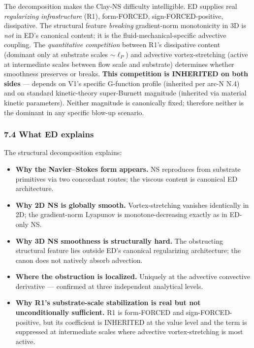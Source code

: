 \documentclass[
  11pt,a4paper]{article}
\providecommand{\tightlist}{%
  \setlength{\itemsep}{0pt}\setlength{\parskip}{0pt}}
\begin{document}
The decomposition makes the Clay-NS difficulty intelligible. ED supplies
real \emph{regularizing infrastructure} (R1), form-FORCED,
sign-FORCED-positive, dissipative. The structural feature
\emph{breaking} gradient-norm monotonicity in 3D is \emph{not} in ED's
canonical content; it is the fluid-mechanical-specific advective
coupling. The \emph{quantitative competition} between R1's dissipative
content (dominant only at substrate scales \(\sim \ell_P\)) and
advective vortex-stretching (active at intermediate scales between flow
scale and substrate) determines whether smoothness preserves or breaks.
\textbf{This competition is INHERITED on both sides} --- depends on V1's
specific G-function profile (inherited per arc-N N.4) and on standard
kinetic-theory super-Burnett magnitude (inherited via material kinetic
parameters). Neither magnitude is canonically fixed; therefore neither
is the dominant in any specific blow-up scenario.

\subsubsection{7.4 What ED explains}\label{what-ed-explains}

The structural decomposition explains:

\begin{itemize}
\tightlist
\item
  \textbf{Why the Navier--Stokes form appears.} NS reproduces from
  substrate primitives via two concordant routes; the viscous content is
  canonical ED architecture.
\item
  \textbf{Why 2D NS is globally smooth.} Vortex-stretching vanishes
  identically in 2D; the gradient-norm Lyapunov is monotone-decreasing
  exactly as in ED-only NS.
\item
  \textbf{Why 3D NS smoothness is structurally hard.} The obstructing
  structural feature lies outside ED's canonical regularizing
  architecture; the canon does not natively absorb advection.
\item
  \textbf{Where the obstruction is localized.} Uniquely at the advective
  convective derivative --- confirmed at three independent analytical
  levels.
\item
  \textbf{Why R1's substrate-scale stabilization is real but not
  unconditionally sufficient.} R1 is form-FORCED and
  sign-FORCED-positive, but its coefficient is INHERITED at the value
  level and the term is suppressed at intermediate scales where
  advective vortex-stretching is most active.
\end{itemize}
\end{document}
